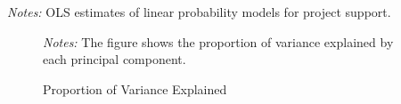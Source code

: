 \documentclass[article,12pt]{memoir}
\begin{document}
\begin{SingleSpacing}
\begin{table}
\begin{threeparttable}
\begin{tabularx}{\linewidth}{X}
  \end{tabularx}
  \begin{tablenotes}[flushleft]
    \item \hspace{-.2em}\emph{Notes:} OLS estimates of linear probability models for project support.
  \end{tablenotes}
  \end{threeparttable}
\end{table}

\begin{figure}[htb]\centering
  \caption{Proportion of Variance Explained}
  \label{fig:hg_g_scree}
  \begin{measuredfigure}
  \end{measuredfigure}
  \begin{tablenotes}[flushleft]
    \item \hspace{-.2em}\emph{Notes:} The figure shows the proportion of variance explained by each principal component.
  \end{tablenotes}
\end{figure}


\end{SingleSpacing}
\end{document}

